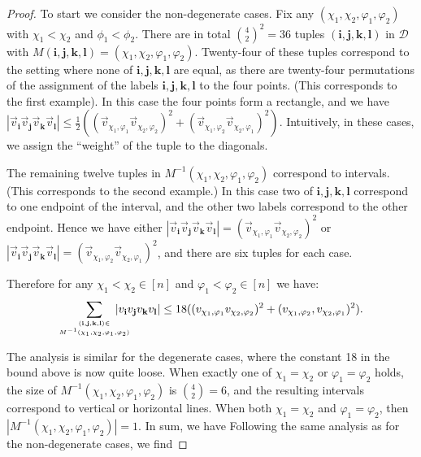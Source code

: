 \def\draft{0}  \documentclass[proceedings]{stacs}
\theoremstyle{plain}\newtheorem{satz}[thm]{Satz}
\theoremstyle{definition}\newtheorem{crucial}[thm]{Crucial Definition}
\begin{document}
\begin{proof}
To start we consider the non-degenerate cases.
Fix any $(\chi_1, \chi_2, \varphi_1, \varphi_2)$ with $\chi_1 < \chi_2$ and $\phi_1 < \phi_2$.
There are in total $\binom{4}{2}^2 = 36$ tuples $(\mathbf i,
\mathbf j, \mathbf k, \mathbf l)$ in $\mathcal D$ with $M(\mathbf i,
\mathbf j, \mathbf k, \mathbf l) = (\chi_1, \chi_2, \varphi_1, \varphi_2)$.  Twenty-four of these tuples
correspond to the setting where none of $\mathbf i, \mathbf j, \mathbf k, \mathbf l$ are equal, as there
are twenty-four permutations of the assignment of the labels $\mathbf i, \mathbf j, \mathbf k, \mathbf l$ to the four points. (This corresponds to the first example).  In this
case the four points form a rectangle, and we have
$|\vec v_{\mathbf i}\vec v_{\mathbf j}\vec v_{\mathbf k}\vec v_{\mathbf l}| \leq \frac 1 2((\vec v_{\chi_1, \varphi_1}\vec v_{\chi_2, \varphi_2})^2 + (
\vec v_{\chi_1, \varphi_2} \vec v_{\chi_2, \varphi_1})^2)$.
Intuitively, in these cases, we assign the ``weight'' of the tuple to the diagonals.

The remaining twelve tuples in $M^{-1}(\chi_1, \chi_2, \varphi_1, \varphi_2)$ correspond to intervals. (This corresponds to the second example.)
In this case two of $\mathbf i, \mathbf j, \mathbf k, \mathbf l$ correspond to one endpoint of the interval, and the other two labels
correspond to the other endpoint.
Hence we have either $|\vec v_{\mathbf i}\vec v_{\mathbf j}\vec v_{\mathbf k}\vec v_{\mathbf l}|
= (\vec v_{\chi_1, \varphi_1}\vec v_{\chi_2, \varphi_2})^2$ or $|\vec v_{\mathbf i}\vec v_{\mathbf j}\vec v_{\mathbf k}\vec v_{\mathbf l}| = (\vec v_{\chi_1, \varphi_2}\vec v_{\chi_2, \varphi_1})^2$, and there are six tuples for each case.

Therefore for any $\chi_1 < \chi_2 \in [n]$
and $\varphi_1 < \varphi_2 \in [n]$ we have:
$$\sum_{\scriptsize{}\substack{(\mathbf i, \mathbf j, \mathbf k, \mathbf l) \in \\  M^{-1}(\chi_1, \chi_2,\varphi_1, \varphi_2)}}\hspace{-.5cm} |v_{\mathbf i}v_{\mathbf j}v_{\mathbf k}v_{\mathbf l}|
\leq 18((v_{\chi_1, \varphi_1}v_{\chi_2, \varphi_2})^2 + (
v_{\chi_1, \varphi_2}, v_{\chi_2, \varphi_1})^2).$$

The analysis is similar for the degenerate cases, where the constant 18 in the bound above is now quite loose.
When exactly one of
$\chi_1 = \chi_2$ or $\varphi_1 = \varphi_2$ holds, the size of
$M^{-1}(\chi_1, \chi_2, \varphi_1, \varphi_2)$ is $\binom{4}{2} =
6$, and the resulting intervals correspond to vertical or horizontal
lines.  When both $\chi_1 = \chi_2$ and $\varphi_1 = \varphi_2$, then
$|M^{-1}(\chi_1,\chi_2, \varphi_1, \varphi_2)| = 1$. In sum, we have
Following the same analysis as for the non-degenerate cases, we find



\end{proof}
\end{document}
